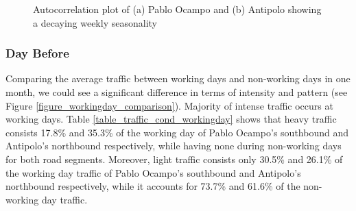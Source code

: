 \begin{figure}[h] 
\centering
    \centering
      \captionsetup{justification=centering}
    \hfill
    \caption{Autocorrelation plot of (a) Pablo Ocampo and (b) Antipolo showing a decaying weekly seasonality}

    \label{figure_autocorr_traffic_month}
\end{figure}
 
\subsubsection{Day Before}

Comparing the average traffic between working days and non-working days in one month, we could see a significant difference in terms of intensity and pattern (see Figure \ref{figure_workingday_comparison}). Majority of intense traffic occurs at working days. Table \ref{table_traffic_cond_workingday} shows that heavy traffic consists 17.8\% and 35.3\% of the working day of Pablo Ocampo’s southbound and Antipolo’s northbound respectively, while having none during non-working days for both road segments. Moreover, light traffic consists only 30.5\% and 26.1\% of the working day traffic of Pablo Ocampo’s southbound and Antipolo’s northbound respectively, while it accounts for 73.7\% and 61.6\% of the non-working day traffic.


